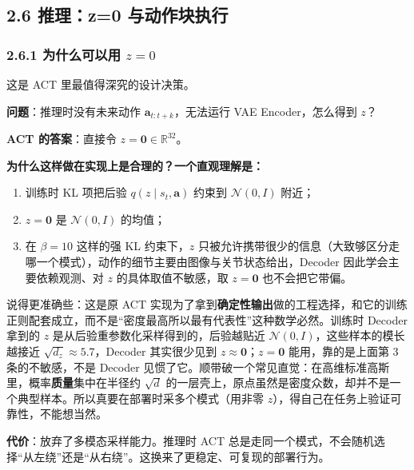 \documentclass[
  chinese,
]{ctexart}
\providecommand{\tightlist}{%
  \setlength{\itemsep}{0pt}\setlength{\parskip}{0pt}}
\begin{document}
\subsection{2.6 推理：z=0
与动作块执行}\label{ux63a8ux7406z0-ux4e0eux52a8ux4f5cux5757ux6267ux884c}

\subsubsection{\texorpdfstring{2.6.1 为什么可以用
\(z = 0\)}{2.6.1 为什么可以用 z = 0}}\label{ux4e3aux4ec0ux4e48ux53efux4ee5ux7528-z-0}

这是 ACT 里最值得深究的设计决策。

\textbf{问题}：推理时没有未来动作 \(\mathbf{a}_{t:t+k}\)，无法运行 VAE
Encoder，怎么得到 \(z\)？

\textbf{ACT 的答案}：直接令 \(z = \mathbf{0} \in \mathbb{R}^{32}\)。

\textbf{为什么这样做在实现上是合理的？一个直观理解是：}

\begin{enumerate}
\def\labelenumi{\arabic{enumi}.}
\tightlist
\item
  训练时 KL 项把后验 \(q(z \mid s_t, \mathbf{a})\) 约束到
  \(\mathcal{N}(0, I)\) 附近；
\item
  \(z = \mathbf{0}\) 是 \(\mathcal{N}(0, I)\) 的均值；
\item
  在 \(\beta = 10\) 这样的强 KL 约束下，\(z\)
  只被允许携带很少的信息（大致够区分走哪一个模式），动作的细节主要由图像与关节状态给出，Decoder
  因此学会主要依赖观测、对 \(z\) 的具体取值不敏感，取 \(z = \mathbf{0}\)
  也不会把它带偏。
\end{enumerate}

说得更准确些：这是原 ACT
实现为了拿到\textbf{确定性输出}做的工程选择，和它的训练正则配套成立，而不是``密度最高所以最有代表性''这种数学必然。训练时
Decoder 拿到的 \(z\) 是从后验重参数化采样得到的，后验越贴近
\(\mathcal{N}(0, I)\)，这些样本的模长越接近
\(\sqrt{d_z} \approx 5.7\)，Decoder 其实很少见到
\(z \approx \mathbf{0}\)；\(z = \mathbf{0}\) 能用，靠的是上面第 3
条的不敏感，不是 Decoder
见惯了它。顺带破一个常见直觉：在高维标准高斯里，概率\textbf{质量}集中在半径约
\(\sqrt{d}\)
的一层壳上，原点虽然是密度众数，却并不是一个典型样本。所以真要在部署时采多个模式（用非零
\(z\)），得自己在任务上验证可靠性，不能想当然。

\textbf{代价}：放弃了多模态采样能力。推理时 ACT
总是走同一个模式，不会随机选择``从左绕''还是``从右绕''。这换来了更稳定、可复现的部署行为。
\end{document}
